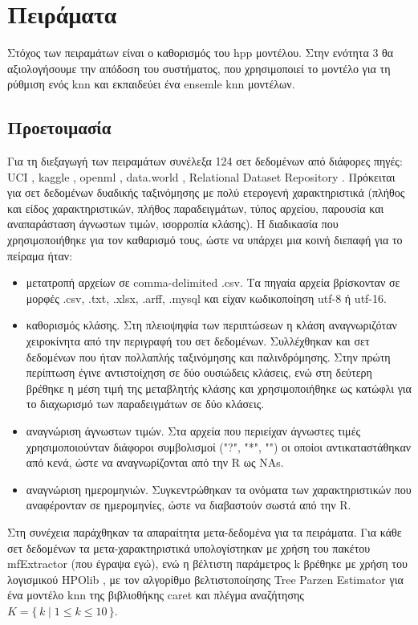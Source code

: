 \documentclass[]{article}
\numberwithin{equation}{section}		%
\numberwithin{figure}{section}			%
\numberwithin{table}{section}				%
\begin{document}
    
    \section{Πειράματα}
    Στόχος των πειραμάτων είναι ο καθορισμός του \gls{hpp} μοντέλου. Στην ενότητα 3 θα αξιολογήσουμε την απόδοση του συστήματος, που χρησιμοποιεί το μοντέλο για τη ρύθμιση ενός knn και εκπαιδεύει ένα ensemle knn μοντέλων.  
    
    \subsection{Προετοιμασία} Για τη διεξαγωγή των πειραμάτων συνέλεξα 124 σετ δεδομένων από διάφορες πηγές: UCI \citep{UCI}, kaggle \citep{kaggle}, openml \citep{openml}, data.world \citep{dataworld}, Relational Dataset Repository \citep{relational}. Πρόκειται για σετ δεδομένων δυαδικής ταξινόμησης με πολύ ετερογενή χαρακτηριστικά (πλήθος και είδος χαρακτηριστικών, πλήθος παραδειγμάτων, τύπος αρχείου, παρουσία και αναπαράσταση άγνωστων τιμών, ισορροπία κλάσης). Η διαδικασία που χρησιμοποιήθηκε για τον καθαρισμό τους, ώστε να υπάρχει μια κοινή διεπαφή για το πείραμα ήταν:
    \begin{itemize}
    	\item μετατροπή αρχείων σε comma-delimited .csv. Τα πηγαία αρχεία βρίσκονταν σε μορφές .csv, .txt, .xlsx, .arff, .mysql και είχαν κωδικοποίηση utf-8 ή utf-16.
    	\item καθορισμός κλάσης. Στη πλειοψηφία των περιπτώσεων η κλάση αναγνωριζόταν χειροκίνητα από την περιγραφή του σετ δεδομένων. Συλλέχθηκαν και σετ δεδομένων που ήταν πολλαπλής ταξινόμησης και παλινδρόμησης. Στην πρώτη περίπτωση έγινε αντιστοίχηση σε δύο ουσιώδεις κλάσεις, ενώ στη δεύτερη βρέθηκε η μέση τιμή της μεταβλητής κλάσης και χρησιμοποιήθηκε ως κατώφλι για το διαχωρισμό των παραδειγμάτων σε δύο κλάσεις.
    	\item αναγνώριση άγνωστων τιμών. Στα αρχεία που περιείχαν άγνωστες τιμές χρησιμοποιούνταν διάφοροι συμβολισμοί ("?", "*", "") οι οποίοι αντικαταστάθηκαν από κενά, ώστε να αναγνωρίζονται από την R ως NAs.  
    	\item αναγνώριση ημερομηνιών. Συγκεντρώθηκαν τα ονόματα των χαρακτηριστικών που αναφέρονταν σε ημερομηνίες, ώστε να διαβαστούν σωστά από την R.
    \end{itemize}
    
    Στη συνέχεια παράχθηκαν τα απαραίτητα μετα-δεδομένα για τα πειράματα. Για κάθε σετ δεδομένων  τα μετα-χαρακτηριστικά υπολογίστηκαν με χρήση του πακέτου mfExtractor (που έγραψα εγώ), ενώ η βέλτιστη παράμετρος k βρέθηκε με χρήση του λογισμικού HPOlib \citep{hpolib}, με τον αλγορίθμο βελτιστοποίησης Tree Parzen Estimator για ένα μοντέλο knn της βιβλιοθήκης caret και πλέγμα αναζήτησης $K = \{\, k \mid 1 \le k \le 10 \,\}$.
    
\end{document}
